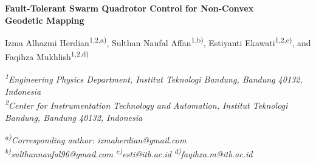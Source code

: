 \documentclass[10pt,letterpaper]{article}
\begin{document}
%

\begin{center}
    {\fontsize{18}{22}\selectfont\bfseries
        Fault-Tolerant Swarm Quadrotor Control for Non-Convex\\ Geodetic Mapping\par}
    \vspace{1.6ex}
        {\fontsize{14}{17}\selectfont
            Izma Alhazmi Herdian\textsuperscript{1,2,a)},
            Sulthan Naufal Affan\textsuperscript{1,b)},
            Estiyanti Ekawati\textsuperscript{1,2,c)}, and
            Faqihza Mukhlish\textsuperscript{1,2,d)}\par}
        \vspace{1.2ex}
        {\fontsize{10}{12}\selectfont\itshape
            \textsuperscript{1}Engineering Physics Department, Institut Teknologi Bandung,
            Bandung 40132, Indonesia\\
            \textsuperscript{2}Center for Instrumentation Technology and Automation,
            Institut Teknologi Bandung, Bandung 40132, Indonesia\par}
        \vspace{1.2ex}
        {\fontsize{10}{12}\selectfont\itshape
            \textsuperscript{a)}Corresponding author: izmaherdian@gmail.com\\
            \textsuperscript{b)}sulthannaufal96@gmail.com\quad
            \textsuperscript{c)}esti@itb.ac.id\quad
            \textsuperscript{d)}faqihza.m@itb.ac.id\par}
\end{center}
\end{document}
